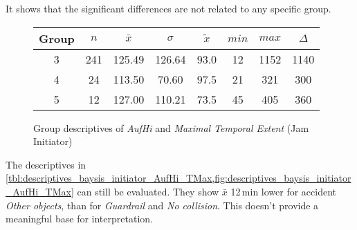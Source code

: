  

It shows that the significant differences are not related to any specific group.
\begin{figure}[ht!]
	\centering
	\begin{minipage}{0.5\textwidth}
		\tiny
		\setlength{\tabcolsep}{4pt}
		\centering
		\begin{tabular}{c|c|c|c|c|c|c|c}
			\toprule
			Group & $n$ & $\bar{x}$ & $\sigma$ & $\tilde{x}$ & $min$ & $max$ & $\Delta$ \\
			\midrule
			3 & 241 & 125.49 & 126.64 & 93.0  & 12  & 1152 & 1140 \\
			4 & 24  & 113.50 & 70.60  & 97.5  & 21  & 321  & 300  \\
			5 & 12  & 127.00 & 110.21 & 73.5  & 45  & 405  & 360  \\
			\bottomrule
		\end{tabular}
		\label{tbl:descriptives_baysis_initiator_AufHi_TMax}
	\end{minipage}%
	\begin{minipage}{0.55\textwidth}
		\data 
        \pgfplotstablesort[sort key=mean, sort cmp=float >]{\datasorted}{\data}
        \tiny
        \centering
		\label{fig:descriptives_baysis_initiator_AufHi_TMax}
	\end{minipage}%
	\caption{Group descriptives of \textit{AufHi} and \textit{Maximal Temporal Extent} (Jam Initiator)}
\end{figure}
The descriptives in \cref{tbl:descriptives_baysis_initiator_AufHi_TMax,fig:descriptives_baysis_initiator_AufHi_TMax} can still be evaluated. They show $\bar{x}$ 12\,min lower for accident \textit{Other objects}, than for \textit{Guardrail} and \textit{No collision}. This doesn't provide a meaningful base for interpretation.

